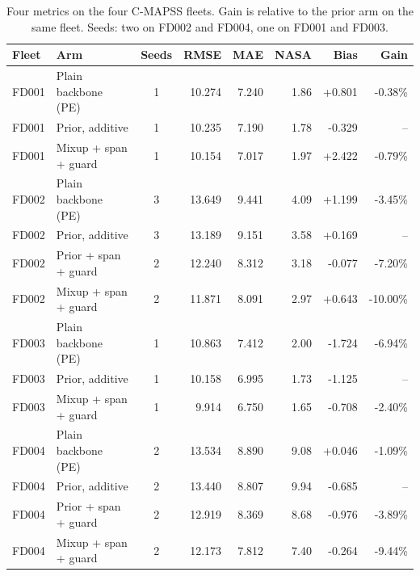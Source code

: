 \begin{table}[t]
\centering
\caption{Four metrics on the four C-MAPSS fleets. Gain is relative to the prior arm on the same fleet. Seeds: two on FD002 and FD004, one on FD001 and FD003.}
\label{tab:main}
\small
\begin{tabular}{llcrrrrr}
\toprule
Fleet & Arm & Seeds & RMSE & MAE & NASA & Bias & Gain \\
\midrule
FD001 & Plain backbone (PE) & 1 & 10.274 & 7.240 & 1.86 & +0.801 & -0.38\% \\
FD001 & Prior, additive & 1 & 10.235 & 7.190 & 1.78 & -0.329 & -- \\
FD001 & Mixup + span + guard & 1 & 10.154 & 7.017 & 1.97 & +2.422 & -0.79\% \\
\midrule
FD002 & Plain backbone (PE) & 3 & 13.649 & 9.441 & 4.09 & +1.199 & -3.45\% \\
FD002 & Prior, additive & 3 & 13.189 & 9.151 & 3.58 & +0.169 & -- \\
FD002 & Prior + span + guard & 2 & 12.240 & 8.312 & 3.18 & -0.077 & -7.20\% \\
FD002 & Mixup + span + guard & 2 & 11.871 & 8.091 & 2.97 & +0.643 & -10.00\% \\
\midrule
FD003 & Plain backbone (PE) & 1 & 10.863 & 7.412 & 2.00 & -1.724 & -6.94\% \\
FD003 & Prior, additive & 1 & 10.158 & 6.995 & 1.73 & -1.125 & -- \\
FD003 & Mixup + span + guard & 1 & 9.914 & 6.750 & 1.65 & -0.708 & -2.40\% \\
\midrule
FD004 & Plain backbone (PE) & 2 & 13.534 & 8.890 & 9.08 & +0.046 & -1.09\% \\
FD004 & Prior, additive & 2 & 13.440 & 8.807 & 9.94 & -0.685 & -- \\
FD004 & Prior + span + guard & 2 & 12.919 & 8.369 & 8.68 & -0.976 & -3.89\% \\
FD004 & Mixup + span + guard & 2 & 12.173 & 7.812 & 7.40 & -0.264 & -9.44\% \\
\bottomrule
\end{tabular}
\end{table}
